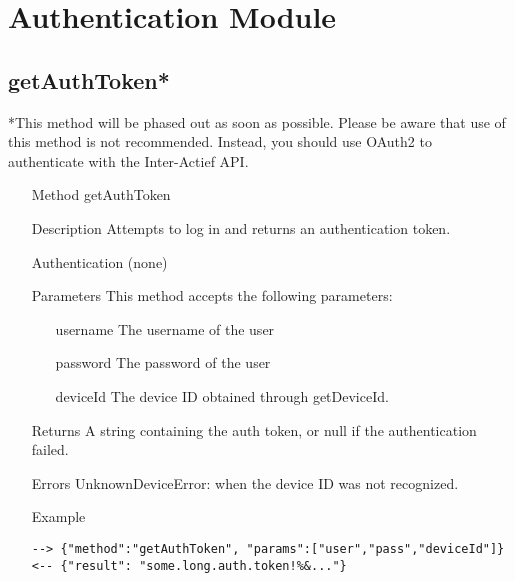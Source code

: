 \documentclass[a4paper]{scrreprt}
\begin{document}
\section{Authentication Module}\label{sec:authmodule}
\subsection{getAuthToken*}\label{m:getAuthToken}
*This method will be phased out as soon as possible. Please be aware that use of this method is not recommended. Instead, you should use OAuth2 to authenticate with the Inter-Actief API.
\begin{enumerate}
\item[Method] getAuthToken
\item[Description] Attempts to log in and returns an authentication token.
\item[Authentication] (none)
\item[Parameters] This method accepts the following parameters:
\begin{enumerate}
    \item[username] The username of the user
    \item[password] The password of the user
    \item[deviceId] The device ID obtained through getDeviceId.
    \end{enumerate}
\item[Returns] A string containing the auth token, or null if the authentication failed.
\item[Errors] UnknownDeviceError: when the device ID was not recognized.
\item[Example]
\begin{lstlisting}
--> {"method":"getAuthToken", "params":["user","pass","deviceId"]}
<-- {"result": "some.long.auth.token!%&..."}
\end{lstlisting}
\end{enumerate}

\clearpage
\end{document}

